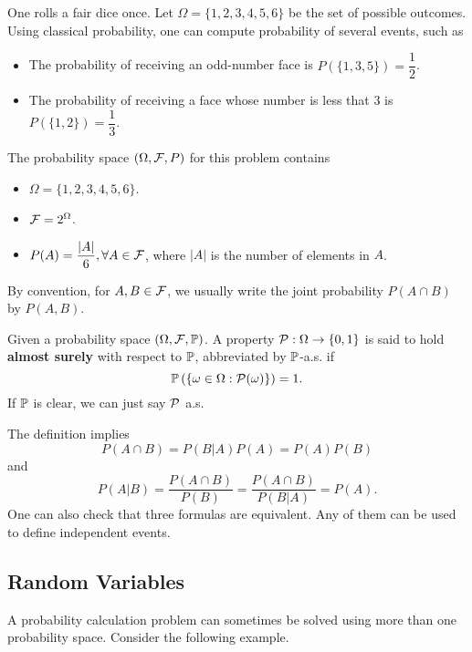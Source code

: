 \begin{example}
 One rolls a fair dice once. Let $\Omega=\{1,2,3,4,5,6\}$ be the set of possible outcomes. Using classical probability, one can compute probability of several events, such as
 \begin{itemize}
  \item The probability of receiving an odd-number face is $P(\{1,3,5\})=\dfrac{1}{2}$.
  \item The probability of receiving a face whose number is less that $3$ is $P(\{1,2\})=\dfrac{1}{3}$.
 \end{itemize}
 The probability space $(\Omega, \F, P)$ for this problem contains
 \begin{itemize}
  \item $\Omega=\{1,2,3,4,5,6\}$.
  \item $\F=2^\Omega$.
  \item $P(A)=\dfrac{|A|}{6},\forall A\in\F$, where $|A|$ is the number of elements in $A$.
 \end{itemize}
\end{example}

\begin{remark}
 By convention, for $A,B\in\F$, we usually write the joint probability
 $P(A\cap B)$ by $P(A,B)$.
\end{remark}

\begin{definition}
 \label{definition:property-almost-surely}
 Given a probability space $(\Omega, \F, \PP)$. A property $\P:\Omega\to\{0,1\}$ is said to hold \textbf{almost surely} with respect to $\PP$, abbreviated by $\PP$-a.s. if
 \begin{equation}
  \PP\left(\left\{\omega\in\Omega : \P(\omega)\right\}\right) = 1.
 \end{equation}
 If $\PP$ is clear, we can just say $\P$ a.s.
\end{definition}

\begin{remark}
 The definition implies
 $$P(A\cap B)=P(B|A)P(A)=P(A)P(B)$$
 and
 $$P(A|B)=\dfrac{P(A\cap B)}{P(B)}=\dfrac{P(A\cap B)}{P(B|A)}=P(A).$$
 One can also check that three formulas are equivalent. Any of them can be used to define independent events.
\end{remark}

\subsection{Random Variables}
A probability calculation problem can sometimes be solved using more than one probability space. Consider the following example.

